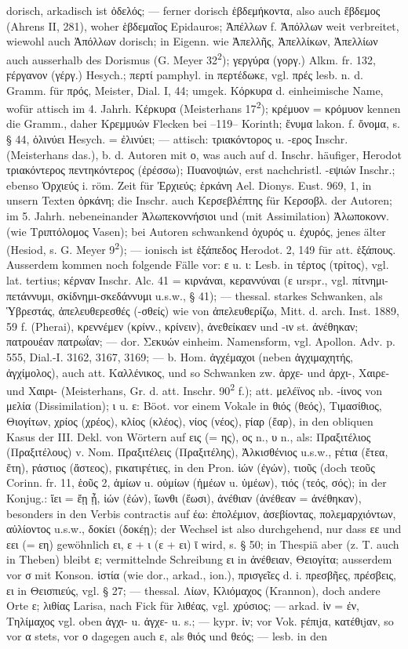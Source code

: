 dorisch, arkadisch ist ὀδελός; — ferner dorisch ἑβδεμήκοντα, also auch ἕβδεμος (Ahrens II, 281), woher ἑβδεμαῖος Epidauros; Ἀπέλλων f. Ἀπόλλων weit verbreitet, wiewohl auch Ἀπόλλων dorisch; in Eigenn. wie Ἀπελλῆς, Ἀπελλίκων, Ἀπελλίων auch ausserhalb des Dorismus (G. Meyer 32\textsuperscript{2}); γεργύρα (γοργ.) Alkm. fr. 132, ϝέργανον (γέργ.) Hesych.; περτί pamphyl. in περτέδωκε, vgl. πρές lesb. n. d. Gramm. für πρός, Meister, Dial. I, 44; umgek. Κόρκυρα d. einheimische Name, wofür attisch im 4. Jahrh. Κέρκυρα (Meisterhans 17\textsuperscript{2}); κρέμυον = κρόμυον kennen die Gramm., daher Κρεμμυών Flecken bei --119-- Korinth; ἔνυμα lakon. f. ὄνομα, s. § 44, ὀλινύει Hesych. = ἐλινύει; — attisch: τριακόντορος u. -ερος Inschr. (Meisterhans das.), b. d. Autoren mit ο, was auch auf d. Inschr. häufiger, Herodot τριακόντερος πεντηκόντερος (ἐρέσσω); Πυανοψιών, erst nachchristl. -εψιών Inschr.; ebenso Ὀρχιεύς i. röm. Zeit für Ἐρχιεύς; ἑρκάνη Ael. Dionys. Eust. 969, 1, in unsern Texten ὁρκάνη; die Inschr. auch Κερσεβλέπτης für Κερσοβλ. der Autoren; im 5. Jahrh. nebeneinander Ἀλωπεκοννήσιοι und (mit Assimilation) Ἀλωποκονν. (wie Τριπτόλομος Vasen); bei Autoren schwankend ὀχυρός u. ἐχυρός, jenes älter (Hesiod, s. G. Meyer 9\textsuperscript{2}); — ionisch ist ἑξάπεδος Herodot. 2, 149 für att. ἑξάπους. Ausserdem kommen noch folgende Fälle vor: ε u. ι: Lesb. in τέρτος (τρίτος), vgl. lat. tertius; κέρναν Inschr. Alc. 41 = κιρνάναι, κεραννύναι (ε urspr., vgl. πίτνημι-πετάννυμι, σκίδνημι-σκεδάννυμι u.s.w., § 41); — thessal. starkes Schwanken, als Ὑβρεστάς, ἀπελευθερεσθές (-σθείς) wie von ἀπελευθερίζω, Mitt. d. arch. Inst. 1889, 59 f. (Pherai), κρεννέμεν (κρίνν., κρίνειν), ἀνεθείκαεν und -ιν st. ἀνέθηκαν; πατρουέαν πατρωΐαν; — dor. Σεκυών einheim. Namensform, vgl. Apollon. Adv. p. 555, Dial.-I. 3162, 3167, 3169; — b. Hom. ἀγχέμαχοι (neben ἀγχιμαχητής, ἀγχίμολος), auch att. Καλλένικος, und so Schwanken zw. ἀρχε- und ἀρχι-, Χαιρε- und Χαιρι- (Meisterhans, Gr. d. att. Inschr. 90\textsuperscript{2} f.); att. μελέϊνος nb. -ίινος von μελία (Dissimilation); ι u. ε: Böot. vor einem Vokale in θιός (θεός), Τιμασίθιος, Θιογίτων, χρίος (χρέος), κλίος (κλέος), νίος (νέος), ϝίαρ (ἔαρ), in den obliquen Kasus der III. Dekl. von Wörtern auf εις (= ης), ος n., υ n., als: Πραξιτέλιος (Πραξιτέλους) v. Nom. Πραξιτέλεις (Πραξιτέλης), Ἀλκισθένιος u.s.w., ϝέτια (ἔτεα, ἔτη), ϝάστιος (ἄστεος), ϝικατιϝέτιες, in den Pron. ἱών (ἐγών), τιοῦς (doch τεοῦς Corinn. fr. 11, ἑοῦς 2, ἁμίων u. οὐμίων (ἡμέων u. ὑμέων), τιός (τεός, σός); in der Konjug.: ἴει = ἔῃ ᾖ, ἰών (ἐών), ἴωνθι (ἔωσι), ἀνέθιαν (ἀνέθεαν = ἀνέθηκαν), besonders in den Verbis contractis auf έω: ἐπολέμιον, ἀσεβίοντας, πολεμαρχιόντων, αὐλίοντος u.s.w., δοκίει (δοκέῃ); der Wechsel ist also durchgehend, nur dass εε und εει (= εη) gewöhnlich ει, ε + ι (ε + ει) ῑ wird, s. § 50; in Thespiä aber (z. T. auch in Theben) bleibt ε; vermittelnde Schreibung ει in ἀνέθειαν, Θειογίτα; ausserdem vor σ mit Konson. ἱστία (wie dor., arkad., ion.), πρισγεῖες d. i. πρεσβῆες, πρέσβεις, ει in Θεισπιεύς, vgl. § 27; — thessal. Λίων, Κλιόμαχος (Krannon), doch andere Orte ε; λιθίας Larisa, nach Fick für λιθέας, vgl. χρύσιος; — arkad. ἰν = ἐν, Τηλίμαχος vgl. oben ἀγχι- u. ἀγχε- u. s.; — kypr. ἰν; vor Vok. ϝέπιjα, κατέθιjαν, so vor α stets, vor ο dagegen auch ε, als θιός und θεός; — lesb. in den 